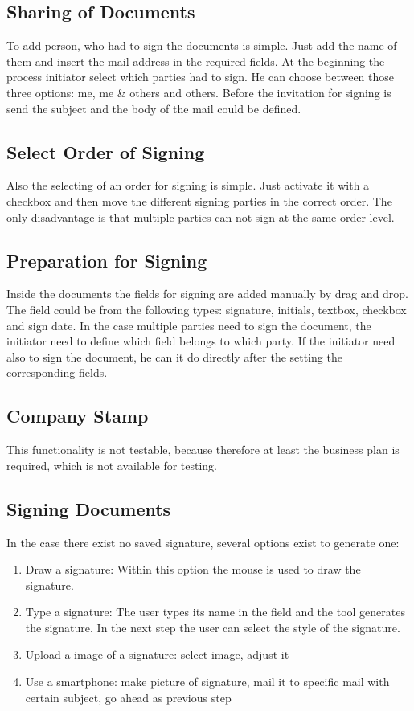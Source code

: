 \subsection{Sharing of Documents}
To add person, who had to sign the documents is simple. Just add the name of them and insert the mail address in the required fields. At the beginning the process initiator select which parties had to sign. He can choose between those three options: me, me \& others and others. Before the invitation for signing is send the subject and the body of the mail could be defined.


\subsection{Select Order of Signing}
Also the selecting of an order for signing is simple. Just activate it with a checkbox and then move the different signing parties in the correct order. The only disadvantage is that multiple parties can not sign at the same order level.

\subsection{Preparation for Signing}
Inside the documents the fields for signing are added manually by drag and drop. The field could be from the following types: signature, initials, textbox, checkbox and sign date. In the case multiple parties need to sign the document, the initiator need to define which field belongs to which party. If the initiator need also to sign the document, he can it do directly after the setting the corresponding fields. 

\subsection{Company Stamp}
This functionality is not testable, because therefore at least the business plan is required, which is not available for testing.

\subsection{Signing Documents}
In the case there exist no saved signature, several options exist to generate one:
\begin{enumerate}
	\item Draw a signature: Within this option the mouse is used to draw the signature.
	\item Type a signature: The user types its name in the field and the tool generates the signature. In the next step the user can select the style of the signature.
	\item Upload a image of a signature: select image, adjust it
	\item Use a smartphone: make picture of signature, mail it to specific mail with certain subject, go ahead as previous step
\end{enumerate}

